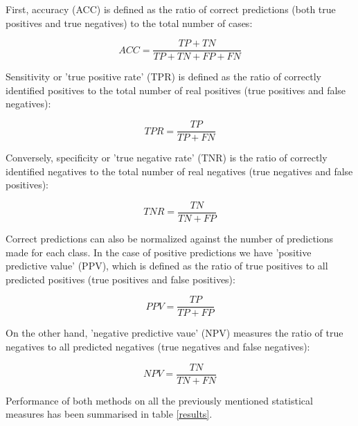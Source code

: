 \documentclass[12pt]{article} %
\begin{document}
	
	First, accuracy (ACC) is defined as the ratio of correct predictions (both true positives and true negatives) to the total number of cases: 
	
\begin{equation}
ACC = \frac{TP + TN}{TP + TN + FP + FN}
\end{equation}
	
	Sensitivity or 'true positive rate' (TPR) is defined as the ratio of correctly identified positives to the total number of real positives (true positives and false negatives):
	
\begin{equation}
TPR = \frac{TP}{TP + FN}
\end{equation}
	
	Conversely, specificity or 'true negative rate' (TNR) is the ratio of correctly identified negatives to the total number of real negatives (true negatives and false positives):
	
\begin{equation}
TNR = \frac{TN}{TN + FP}
\end{equation}
	
	Correct predictions can also be normalized against the number of predictions made for each class. In the case of positive predictions we have 'positive predictive value' (PPV), which is defined as the ratio of true positives to all predicted positives (true positives and false positives):
	
\begin{equation}
PPV = \frac{TP}{TP + FP}
\end{equation}
	
	 On the other hand, 'negative predictive vaue' (NPV) measures the ratio of true negatives to all predicted negatives (true negatives and false negatives):
	 
\begin{equation}
NPV = \frac{TN}{TN + FN}
\end{equation}
	
	Performance of both methods on all the previously mentioned statistical measures has been summarised in table \ref{results}.
\end{document}
